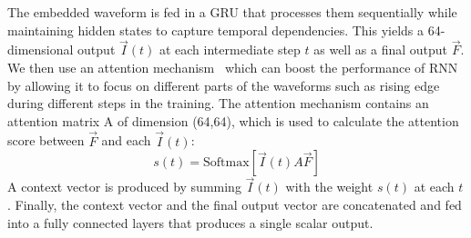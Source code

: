 The embedded waveform is fed in a GRU that processes them sequentially while maintaining hidden states to capture temporal dependencies. This yields a 64-dimensional output $\vec{I}(t)$ at each intermediate step $t$ as well as a final output  $\vec{F}$. We then use an attention mechanism~\cite{attention} which can boost the performance of RNN by allowing it to focus on different parts of the waveforms such as rising edge during different steps in the training. The attention mechanism contains an attention matrix A of dimension (64,64), which is used to calculate the attention score between $\vec{F}$ and each $\vec{I}(t)$:
\begin{equation}
    s(t) = \mathrm{Softmax}[\vec{I}(t) A \vec{F}]
\end{equation}
A context vector is produced by summing $\vec{I}(t)$ with the weight $s(t)$ at each $t$. Finally, the context vector and the final output vector are concatenated and fed into a fully connected layers that produces a single scalar output.


